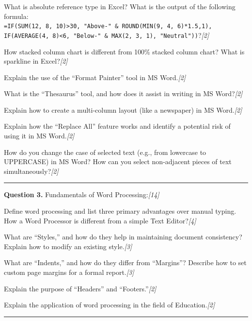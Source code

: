 \documentclass[11pt,a4paper]{article}
\newcommand{\pts}[1]{\hfill   \textit{[#1]}}
\begin{document}
\begin{parts}
  \item What is absolute reference type in Excel? What is the output of the following formula:\\
   \texttt{=IF(SUM(12, 8, 10)>30, "Above-" \& ROUND(MIN(9, 4, 6)*1.5,1), IF(AVERAGE(4, 8)<6, "Below-" \& MAX(2, 3, 1), "Neutral"))}?\pts{2}
  \item How stacked column chart is different from 100\% stacked column chart? What is sparkline in Excel?\pts{2}
  \item Explain the use of the ``Format Painter'' tool in MS Word.\pts{2}
  \item What is the ``Thesaurus'' tool, and how does it assist in writing in MS Word?\pts{2}
  \item Explain how to create a multi-column layout (like a newspaper) in MS Word.\pts{2}
  \item Explain how the ``Replace All'' feature works and identify a potential risk of using it in MS Word.\pts{2}
  \item How do you change the case of selected text (e.g., from lowercase to UPPERCASE) in MS Word? How can you select non-adjacent pieces of text simultaneously?\pts{2}
\end{parts}

\medskip\rule{\linewidth}{0.2pt}




\noindent   \textbf{Question 3.} Fundamentals of Word Processing:\pts{14}

\begin{parts}
  \item Define word processing and list three primary advantages over manual typing. How a Word Processor is different from a simple Text Editor?\pts{4}
  \item What are ``Styles,'' and how do they help in maintaining document consistency? Explain how to modify an existing style.\pts{3}
  \item What are ``Indents,'' and how do they differ from ``Margins''? Describe how to set custom page margins for a formal report.\pts{3}
  \item Explain the purpose of ``Headers'' and ``Footers.''\pts{2}
  \item Explain the application of word processing in the field of Education.\pts{2}
\end{parts}

\medskip\rule{\linewidth}{0.2pt}
\end{document}
